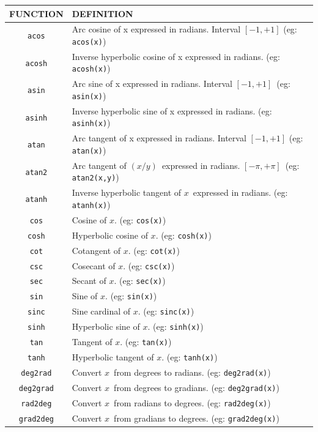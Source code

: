 \documentclass{book}
\def\lthtmlcheckvsize{\ifdim\ht\sizebox<\vsize 
  \ifdim\wd\sizebox<\hsize\expandafter\hfill\fi \expandafter\vfill
  \else\expandafter\vss\fi}%
\begin{document}
{\newpage\clearpage
{}%
\begin{tabular}{|c|p{}|}
\hline
FUNCTION & DEFINITION\\
\hline
\verb'acos'& Arc cosine of x expressed in radians. Interval $[-1,+1]$
(eg: \verb'acos(x)')\\
\verb'acosh'& Inverse hyperbolic cosine of x expressed in radians. (eg: \verb'acosh(x)')\\
\verb'asin'& Arc sine of x expressed in radians. Interval $[-1,+1]$\  (eg: \verb'asin(x)')\\
\verb'asinh'& Inverse hyperbolic sine of x expressed in radians. (eg:
\verb'asinh(x)')\\
\verb'atan'& Arc tangent of x expressed in radians. Interval $[-1,+1]$
(eg: \verb'atan(x)')\\
\verb'atan2'& Arc tangent of $(x / y)$\  expressed in
radians. $[-\pi,+\pi]$\  (eg: \verb'atan2(x,y)')\\
\verb'atanh'& Inverse hyperbolic tangent of $x$\  expressed in radians. (eg: \verb'atanh(x)')\\
\verb'cos'& Cosine of $x$.  (eg: \verb'cos(x)')\\
\verb'cosh'& Hyperbolic cosine of $x$.  (eg: \verb'cosh(x)')\\
\verb'cot'& Cotangent of $x$.  (eg: \verb'cot(x)')\\
\verb'csc'& Cosecant of $x$.  (eg: \verb'csc(x)')\\
\verb'sec'& Secant of $x$.  (eg: \verb'sec(x)')\\
\verb'sin'& Sine of $x$.  (eg: \verb'sin(x)')\\
\verb'sinc'& Sine cardinal of $x$.  (eg: \verb'sinc(x)')\\
\verb'sinh'& Hyperbolic sine of $x$.  (eg: \verb'sinh(x)')\\
\verb'tan'& Tangent of $x$.  (eg: \verb'tan(x)')\\
\verb'tanh'& Hyperbolic tangent of $x$.  (eg: \verb'tanh(x)')\\
\verb'deg2rad'& Convert $x$\  from degrees to radians.  (eg: \verb'deg2rad(x)')\\
\verb'deg2grad'& Convert $x$\  from degrees to gradians.  (eg: \verb'deg2grad(x)')\\
\verb'rad2deg'& Convert $x$\  from radians to degrees.  (eg: \verb'rad2deg(x)')\\
\verb'grad2deg'& Convert $x$\  from gradians to degrees.  (eg: \verb'grad2deg(x)')\\
\hline
\end{tabular}%
\lthtmlfigureZ
\lthtmlcheckvsize\clearpage}
\end{document}
